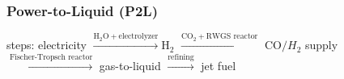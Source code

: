 \documentclass[a4paper,10pt,landscape]{scrartcl}
\begin{document}
\begin{multicols*}{3}
\subsubsection{Power-to-Liquid (P2L)}
steps: electricity $\xrightarrow{\mathrm{H}_2\mathrm{O}+\text{electrolyzer}} \mathrm{H}_2$ $\xrightarrow{\mathrm{CO}_2+\text{RWGS reactor}}$ $\mathrm{CO}/H_2$ supply $\xrightarrow{\text{Fischer-Tropsch reactor}}$ gas-to-liquid $\xrightarrow{\text{refining}}$ jet fuel 






\end{multicols*}
\end{document}
